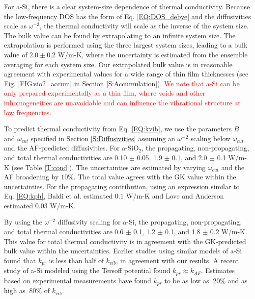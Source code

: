 \documentclass[aps,prb,twocolumn,superscriptaddress,footinbib,amsmath,amssymb,floatfix]{revtex4}
\begin{document}
For a-Si, there is a clear system-size dependence of thermal 
conductivity. 
Because the low-frequency DOS has the form of Eq. \eqref{EQ:DOS_debye} 
and the diffusivities scale as $\omega^{-2}$,  
the thermal conductivity will scale as the inverse of the system size. 
The bulk value can be found by extrapolating to an infinite system size.
\cite{shiomi_thermal_2011,esfarjani_heat_2011,larkin_comparison_2012} 
The extrapolation is performed using the three largest 
system sizes,\cite{mfp_fn2} leading to a bulk value 
of $2.0 \pm 0.2$ W/m-K, where the uncertainty is 
estimated from the ensemble averaging for each system size. 
Our extrapolated bulk value 
is in reasonable agreement with experimental values for a wide 
range of thin film thicknesses (see Fig. \ref{FIG:sio2_accum} in 
Section \ref{S:Accumulation}). 
\textcolor{red}{
We note that a-Si can be only prepared experimentally as a thin film, 
where voids and other inhomogeneities are unavoidable
\cite{vacher_attenuation_1980,feldman_thermal_1993,liu_high_2009,
yang_anomalously_2010,li_effect_2011} and can influence the 
vibrational structure at low frequencies.
}

To predict thermal conductivity from Eq. \eqref{EQ:kvib}, 
we use the parameters $B$ and $\omega_{cut}$ specified 
in Section \ref{S:Diffusivities} assuming an $\omega^{-2}$ 
scaling below $\omega_{cut}$ and the AF-predicted diffusivities. 
For a-SiO$_2$, the propagating, non-propagating, and total thermal 
conductivities are 0.10 $\pm$ 0.05, 1.9 $\pm$ 0.1, 
and 2.0 $\pm$ 0.1 W/m-K (see Table \ref{T:cond}). The uncertainties 
are estimated by varying $\omega_{cut}$ and the AF 
broadening by $10\%$.  
The total value agrees with the GK value within the uncertainties. 
For the propagating contribution, 
using an expression similar to Eq. \eqref{EQ:kph}, 
Baldi et al.\cite{baldi_thermal_2008} estimated $0.1$ W/m-K and 
Love and Anderson\cite{love_estimate_1990} estimated 0.03 W/m-K.

By using the $\omega^{-2}$ diffusivity scaling for a-Si, 
the propagating, non-propagating, and total thermal conductivities 
are 0.6 $\pm$ 0.1, 1.2 $\pm$ 0.1, and 1.8 $\pm$ 0.2 W/m-K. 
This value for total thermal conductivity 
is in agreement with the GK-predicted bulk value within the 
uncertainties. Earlier studies using 
similar models of a-Si found 
that $k_{pr}$ is less than half of 
$k_{vib}$,\cite{feldman_thermal_1993,
feldman_numerical_1999} in agreement with our results.  
A recent study of a-Si modeled using the Tersoff potential found 
$k_{pr} \approx k_{AF}$.\cite{he_heat_2011} 
Estimates based on experimental measurements 
have found $k_{pr}$ to be as low 
as $~20\%$\cite{cahill_thermal_1994,feldman_numerical_1999} 
and as high as $~80\%$ of $k_{vib}$.
\cite{liu_high_2009,yang_anomalously_2010}
\end{document}
